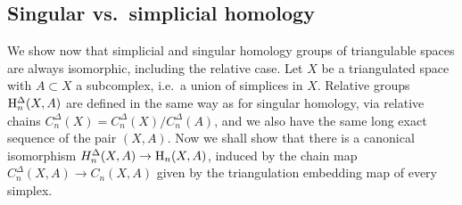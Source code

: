 \subsection{Singular vs.~simplicial homology}

We show now that simplicial and singular homology groups of triangulable spaces are always isomorphic, including the relative case. Let $X$ be a triangulated space with $A\subset X$ a subcomplex, i.e.\ a union of simplices in $X$. Relative groups $\mathrm{H}^{\Delta}_n(X,A)$ are defined in the same way as for singular homology, via relative chains $C^\Delta_n(X)=C^\Delta_n(X)/C^\Delta_n(A)$, and we also have the same long exact sequence of the pair $(X,A)$. Now we shall show that there is a canonical isomorphism $H^\Delta_n(X,A)\to \mathrm{H}_n(X,A)$, induced by the chain map $C_n^\Delta(X,A)\to C_n(X,A)$ given by the triangulation embedding map of every simplex. 

